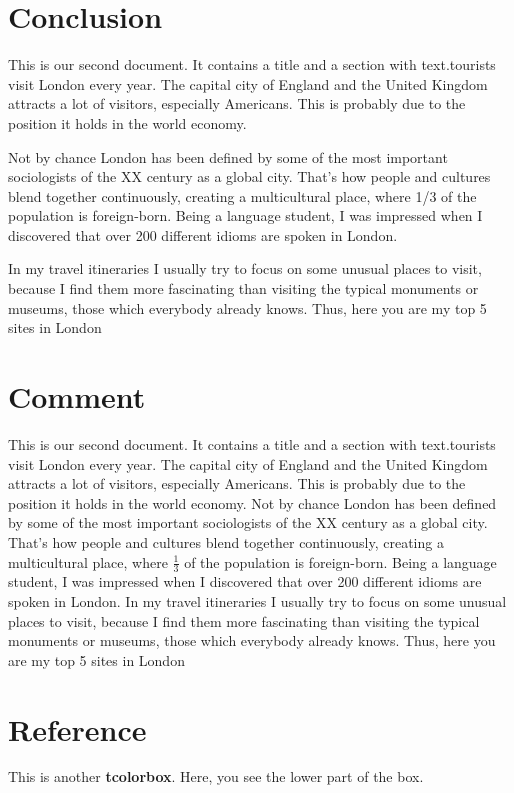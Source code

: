 \documentclass[a4paper,11pt]{ctexart}
\begin{document}
\section{Conclusion}
This is our second document. It contains a title and a 
section with text.tourists visit London every year. The capital city of England and the United Kingdom attracts a lot of visitors, especially Americans. This is probably due to the position it holds in the world economy.\par
Not by chance London has been defined by some of the most important sociologists of the XX century as a global city. That’s how people and cultures blend together continuously, creating a multicultural place, where 1/3 of the population is foreign-born. Being a language student, I was impressed when I discovered that over 200 different idioms are spoken in London.\par
In my travel itineraries I usually try to focus on some unusual places to visit, because I find them more fascinating than visiting the typical monuments or museums, those which everybody already knows. Thus, here you are my top 5 sites in London

\section{Comment}
This is our second document\cite{RN872,RN853,RN863,RN871}. It contains a title and a 
section with text.tourists visit London every year. The capital city of England and the United Kingdom attracts a lot of visitors, especially Americans. This is probably due to the position it holds in the world economy.
Not by chance London has \cite{RN942} been defined by some of the most important sociologists of the XX century as a global city. That’s how people and cultures blend together continuously, creating a multicultural place, where $\frac{1}{3}$ of the population is foreign-born. Being a language student, I was impressed when I discovered that over 200 different idioms are spoken in London.
In my travel itineraries I usually try to focus on some unusual places to visit, because I find them more fascinating than visiting the typical monuments or museums, those which everybody already knows. Thus, here you are my top 5 sites in London

\newpage
\section{Reference}

\begin{tcolorbox}[title=\textbf{$\ggg$ My nice heading}]
This  is  another  \textbf{tcolorbox}.
\tcblower
Here,  you  see  the  lower  part  of  the  box.
\end{tcolorbox}
\end{document}
